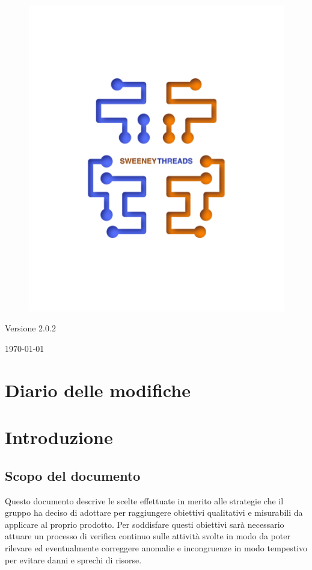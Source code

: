 \documentclass[a4paper]{article}
\begin{document}
\begin{titlepage}
		\begin{figure}[H]
			\centering
			\includegraphics[scale=0.8]{sweeney.png}
		\end{figure}
		\begin{center}
			Versione 2.0.2
		\end{center}
		{\large \today}\\[3cm] 
		\vfill  
	\end{titlepage}
	
	\tableofcontents
	\newpage
	\section*{Diario delle modifiche}
     
	\newpage
    \section{Introduzione}
		\subsection{Scopo del documento}
			Questo documento descrive le scelte effettuate in merito alle strategie 
			che il gruppo ha deciso di adottare per raggiungere obiettivi qualitativi e misurabili da 
			applicare al proprio prodotto. Per soddisfare questi obiettivi sarà necessario attuare un 
			processo di verifica continuo sulle attività svolte in modo da poter rilevare ed eventualmente 
			correggere anomalie e incongruenze in modo tempestivo per evitare danni e sprechi di risorse.
\end{document}
